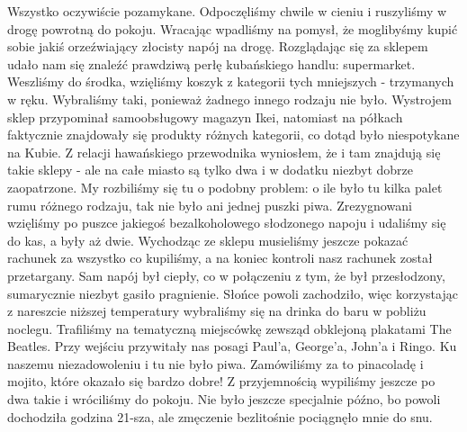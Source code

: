 Wszystko oczywiście pozamykane. 
Odpoczęliśmy chwile w cieniu i ruszyliśmy w drogę powrotną do pokoju.
Wracając wpadliśmy na pomysł, że moglibyśmy kupić sobie jakiś orzeźwiający złocisty napój na drogę. 
Rozglądając się za sklepem udało nam się znaleźć prawdziwą perłę kubańskiego handlu: supermarket.
Weszliśmy do środka, wzięliśmy koszyk z kategorii tych mniejszych - trzymanych w ręku. 
Wybraliśmy taki, ponieważ żadnego innego rodzaju nie było. 
Wystrojem sklep przypominał samoobsługowy magazyn Ikei, natomiast na półkach faktycznie znajdowały się produkty różnych kategorii, co dotąd było niespotykane na Kubie. 
Z relacji hawańskiego przewodnika wyniosłem, że i tam znajdują się takie sklepy - ale na całe miasto są tylko dwa i w dodatku niezbyt dobrze zaopatrzone. 
My rozbiliśmy się tu o podobny problem: o ile było tu kilka palet rumu różnego rodzaju, tak nie było ani jednej puszki piwa. 
Zrezygnowani wzięliśmy po puszce jakiegoś bezalkoholowego słodzonego napoju i udaliśmy się do kas, a były aż dwie. 
Wychodząc ze sklepu musieliśmy jeszcze pokazać rachunek za wszystko co kupiliśmy, a na koniec kontroli nasz rachunek został przetargany. 
Sam napój był ciepły, co w połączeniu z tym, że był przesłodzony, sumarycznie niezbyt gasiło pragnienie. 
Słońce powoli zachodziło, więc korzystając z nareszcie niższej temperatury wybraliśmy się na drinka do baru w pobliżu noclegu.
Trafiliśmy na tematyczną miejscówkę zewsząd obklejoną plakatami The Beatles. 
Przy wejściu przywitały nas posagi Paul’a, George’a, John’a i Ringo.
Ku naszemu niezadowoleniu i tu nie było piwa.
Zamówiliśmy za to pinacoladę i mojito, które okazało się bardzo dobre! 
Z przyjemnością wypiliśmy jeszcze po dwa takie i wróciliśmy do pokoju.
Nie było jeszcze specjalnie późno, bo powoli dochodziła godzina 21-sza, ale zmęczenie bezlitośnie pociągnęło mnie do snu.
